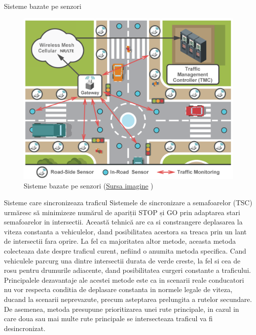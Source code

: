 \documentclass{beamer}
\begin{document}
    \begin{frame}{Sisteme bazate pe senzori}
        \begin{figure}[h!]
            \includegraphics[width=(\textwidth / 4) * 3]{SensorsBasedTrafficControlSystemRepresentation.png}
            \caption{Sisteme bazate pe senzori 
            (\href{https://www.researchgate.net/figure/Communications-chain-of-data-feeds-in-smart-transportation_fig3_309740417}{Sursa imagine} \textcopyright)}
            \label{fig:SensorRecognitionSystem}
        \end{figure}
    \end{frame}

    \begin{frame}{Sisteme care sincronizeaza traficul}
        Sistemele de sincronizare a semafoarelor (TSC) urmăresc să minimizeze
        numărul de apariții STOP și GO prin adaptarea stari semafoarelor in intersectii.
        Această tehnică are ca si constrangere deplasarea la viteza constanta a vehiculelor,
        dand posibilitatea acestora sa treaca prin un lant de intersectii fara 
        oprire. La fel ca majoritatea altor metode, aceasta metoda colecteaza 
        date despre traficul curent, nefiind o anumita metoda specifica. 
        Cand vehiculele parcurg una dintre intersectii durata de verde creste, 
        la fel si cea de rosu pentru drumurile adiacente, dand posibilitatea curgeri 
        constante a traficului. \\
        Principalele dezavantaje ale acestei metode este ca in scenarii reale 
        conducatori nu vor respecta conditia de deplasare constanta in normele 
        legale de viteza, ducand la scenarii neprevazute, precum asteptarea 
        prelungita a rutelor secundare. De asemenea, metoda presupune prioritizarea 
        unei rute principale, in cazul in care doua sau mai multe rute principale 
        se intersecteaza traficul va fi desincronizat.

    \end{frame}
\end{document}
